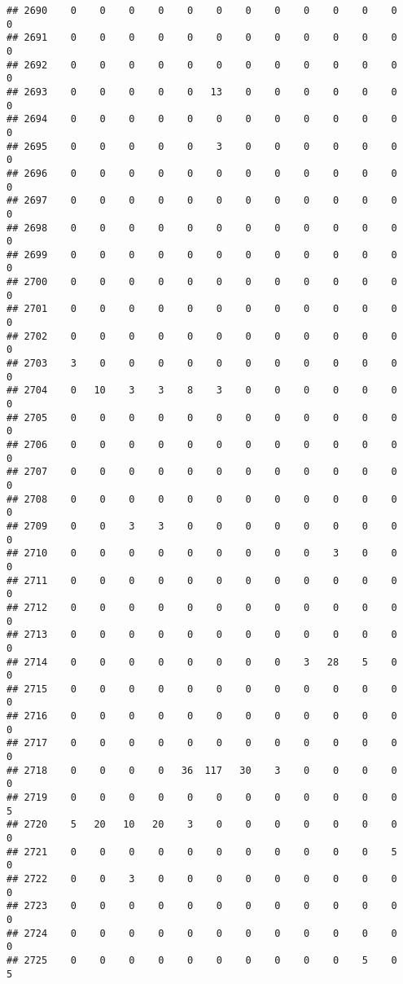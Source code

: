 \documentclass[]{article}
\begin{document}
\begin{verbatim}
## 2690    0    0    0    0    0    0    0    0    0    0    0    0    0
## 2691    0    0    0    0    0    0    0    0    0    0    0    0    0
## 2692    0    0    0    0    0    0    0    0    0    0    0    0    0
## 2693    0    0    0    0    0   13    0    0    0    0    0    0    0
## 2694    0    0    0    0    0    0    0    0    0    0    0    0    0
## 2695    0    0    0    0    0    3    0    0    0    0    0    0    0
## 2696    0    0    0    0    0    0    0    0    0    0    0    0    0
## 2697    0    0    0    0    0    0    0    0    0    0    0    0    0
## 2698    0    0    0    0    0    0    0    0    0    0    0    0    0
## 2699    0    0    0    0    0    0    0    0    0    0    0    0    0
## 2700    0    0    0    0    0    0    0    0    0    0    0    0    0
## 2701    0    0    0    0    0    0    0    0    0    0    0    0    0
## 2702    0    0    0    0    0    0    0    0    0    0    0    0    0
## 2703    3    0    0    0    0    0    0    0    0    0    0    0    0
## 2704    0   10    3    3    8    3    0    0    0    0    0    0    0
## 2705    0    0    0    0    0    0    0    0    0    0    0    0    0
## 2706    0    0    0    0    0    0    0    0    0    0    0    0    0
## 2707    0    0    0    0    0    0    0    0    0    0    0    0    0
## 2708    0    0    0    0    0    0    0    0    0    0    0    0    0
## 2709    0    0    3    3    0    0    0    0    0    0    0    0    0
## 2710    0    0    0    0    0    0    0    0    0    3    0    0    0
## 2711    0    0    0    0    0    0    0    0    0    0    0    0    0
## 2712    0    0    0    0    0    0    0    0    0    0    0    0    0
## 2713    0    0    0    0    0    0    0    0    0    0    0    0    0
## 2714    0    0    0    0    0    0    0    0    3   28    5    0    0
## 2715    0    0    0    0    0    0    0    0    0    0    0    0    0
## 2716    0    0    0    0    0    0    0    0    0    0    0    0    0
## 2717    0    0    0    0    0    0    0    0    0    0    0    0    0
## 2718    0    0    0    0   36  117   30    3    0    0    0    0    0
## 2719    0    0    0    0    0    0    0    0    0    0    0    0    5
## 2720    5   20   10   20    3    0    0    0    0    0    0    0    0
## 2721    0    0    0    0    0    0    0    0    0    0    0    5    0
## 2722    0    0    3    0    0    0    0    0    0    0    0    0    0
## 2723    0    0    0    0    0    0    0    0    0    0    0    0    0
## 2724    0    0    0    0    0    0    0    0    0    0    0    0    0
## 2725    0    0    0    0    0    0    0    0    0    0    5    0    5

\end{verbatim}
\end{document}
